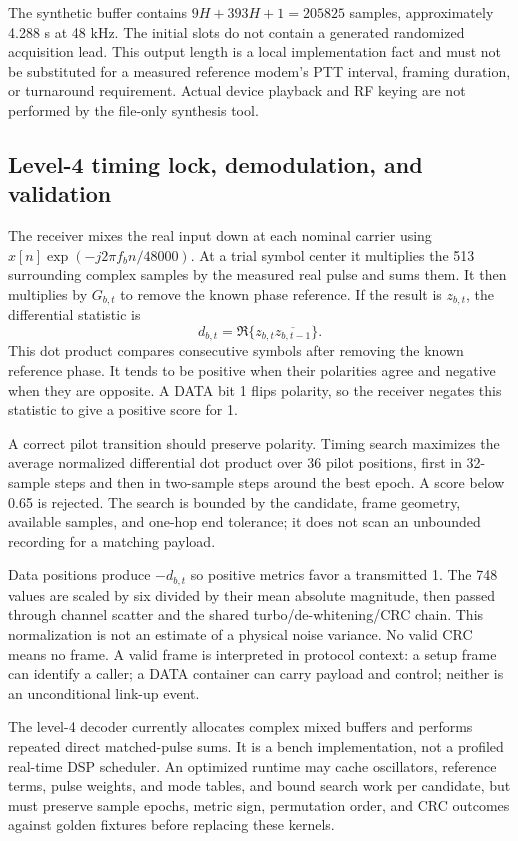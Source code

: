 The synthetic buffer contains $9H+393H+1=205825$ samples, approximately
4.288 s at 48 kHz. The initial slots do not contain a generated randomized
acquisition lead. This output length is a local implementation fact and must
not be substituted for a measured reference modem's PTT interval, framing
duration, or turnaround requirement. Actual device playback and RF keying are
not performed by the file-only synthesis tool.

\subsection{Level-4 timing lock, demodulation, and validation}
The receiver mixes the real input down at each nominal carrier using
$x[n]\exp(-j2\pi f_b n/48000)$. At a trial symbol center it multiplies the
513 surrounding complex samples by the measured real pulse and sums them.
It then multiplies by $G_{b,t}$ to remove the known phase reference. If the
result is $z_{b,t}$, the differential statistic is
\[
 d_{b,t}=\Re\{z_{b,t}\overline{z_{b,t-1}}\}.
\]
This dot product compares consecutive symbols after removing the known
reference phase. It tends to be positive when their polarities agree
and negative when they are opposite. A DATA bit 1 flips polarity,
so the receiver negates this statistic to give a positive score for 1.

A correct pilot transition should preserve polarity. Timing search maximizes
the average normalized differential dot product over 36 pilot positions,
first in 32-sample steps and then in two-sample steps around the best epoch.
A score below 0.65 is rejected. The search is bounded by the candidate, frame
geometry, available samples, and one-hop end tolerance; it does not scan an
unbounded recording for a matching payload.

Data positions produce $-d_{b,t}$ so positive metrics favor a transmitted 1.
The 748 values are scaled by six divided by their mean absolute magnitude,
then passed through channel scatter and the shared turbo/de-whitening/CRC
chain. This normalization is not an estimate of a physical noise variance.
No valid CRC means no frame. A valid frame is interpreted in protocol context:
a setup frame can identify a caller; a DATA container can carry payload and
control; neither is an unconditional link-up event.


The level-4 decoder currently allocates complex mixed buffers and performs
repeated direct matched-pulse sums. It is a bench implementation, not a
profiled real-time DSP scheduler. An optimized runtime may cache oscillators,
reference terms, pulse weights, and mode tables, and bound search work per
candidate, but must preserve sample epochs, metric sign, permutation order,
and CRC outcomes against golden fixtures before replacing these kernels.
